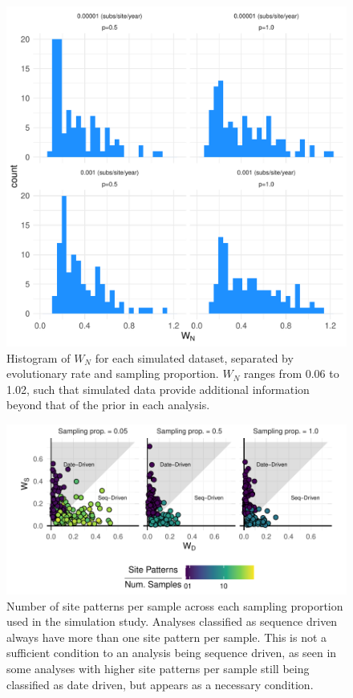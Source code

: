 \documentclass{article}
\begin{document}
\begin{figure}[H]
\centering
\includegraphics[width=1\linewidth]{../figures/wnHist.pdf}
\caption{Histogram of $W_N$ for each simulated dataset, separated by evolutionary rate and sampling proportion. $W_N$ ranges from 0.06 to 1.02, such that simulated data provide additional information beyond that of the prior in each analysis.}
\label{fig:wnHist}
\end{figure}

\begin{figure}[H]
\centering
\includegraphics[width=1\linewidth]{../figures/relSP.pdf}
\caption{Number of site patterns per sample across each sampling proportion used in the simulation study. Analyses classified as sequence driven always have more than one site pattern per sample. This is not a sufficient condition to an analysis being sequence driven, as seen in some analyses with higher site patterns per sample still being classified as date driven, but appears as a necessary condition.}
\label{fig:relSP}
\end{figure}
\end{document}

